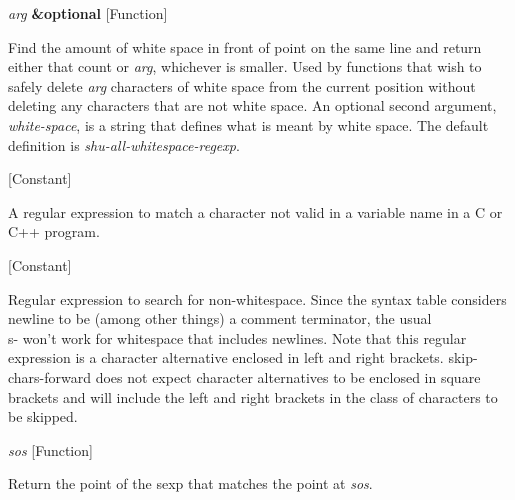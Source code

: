 \vspace{1em}
\noindent
{}
\usebox{\funcname}\emph{arg} \textbf{\&optional}
 \hfill [Function]
\hspace*{\wd\funcname}

\begin{doc-string}
Find the amount of white space in front of point on the same line and return
either that count or \emph{arg}, whichever is smaller.  Used by functions that wish to
safely delete \emph{arg} characters of white space from the current position without
deleting any characters that are not white space.  An optional second argument,
\emph{white-space}, is a string that defines what is meant by white space.  The default
definition is \emph{shu-all-whitespace-regexp}.
\end{doc-string}

\vspace{1em}
\noindent
{}
\usebox{\funcname}
 \hfill [Constant]

\begin{doc-string}
A regular expression to match a character not valid in a variable name
in a C or C++ program.
\end{doc-string}

\vspace{1em}
\noindent
{}
\usebox{\funcname}
 \hfill [Constant]

\begin{doc-string}
Regular expression to search for non-whitespace.  Since the syntax table considers
newline to be (among other things) a comment terminator, the usual \\s- won't work
for whitespace that includes newlines.  Note that this regular expression is a
character alternative enclosed in left and right brackets.  skip-chars-forward does
not expect character alternatives to be enclosed in square brackets and will include
the left and right brackets in the class of characters to be skipped.
\end{doc-string}

\vspace{1em}
\noindent
{}
\usebox{\funcname}\emph{sos}
 \hfill [Function]

\begin{doc-string}
Return the point of the sexp that matches the point at \emph{sos}.
\end{doc-string}

